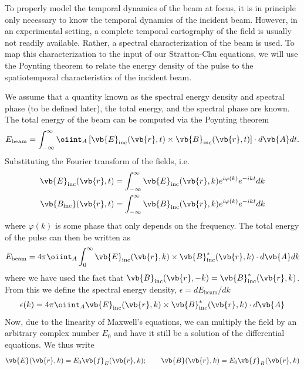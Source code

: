 \documentclass[11pt,SymmetricalJury]{inrsthesis/inrsthesis}
\begin{document}
To properly model the temporal dynamics of the beam at focus, it is in principle
only necessary to know the temporal dynamics of the incident beam. However, in
an experimental setting, a complete temporal cartography of the field is usually
not readily available. Rather, a spectral characterization of the beam is used.
To map this characterization to the input of our Stratton-Chu equations, we will
use the Poynting theorem to relate the energy density of the pulse to the
spatiotemporal characteristics of the incident beam.

We assume that a quantity known as the spectral energy density and spectral
phase (to be defined later), the total energy, and the spectral phase are
known. The total energy of the beam can be computed via the Poynting theorem
  \begin{equation}
    E_\text{beam}
      =
      \int_{-\infty}^\infty \oiint_A
        \left[\vb{E}_\text{inc}(\vb{r},t)\times\vb{B}_\text{inc}(\vb{r},t)\right]\cdot d\vb{A}dt.
  \end{equation}
Substituting the Fourier transform of the fields, i.e.
  \begin{align}
    \vb{E}_\text{inc}(\vb{r},t) &=
      \int_{-\infty}^\infty
        \vb{E}_\text{inc}(\vb{r},k)e^{i\varphi(k)}e^{-ik t} dk \\
    \vb{B_\text{inc}}(\vb{r},t) &=
      \int_{-\infty}^\infty
        \vb{B}_\text{inc}(\vb{r},k)e^{i\varphi(k)}e^{-ik t} dk
  \end{align}
where $\varphi(k)$ is some phase that only depends on the frequency. The total
energy of the pulse can then be written as
  \begin{equation}
    E_\text{beam} = 4\pi \oiint_A \int_0^\infty
        \real{\vb{E}_\text{inc}(\vb{r},k)\times\vb{B}_\text{inc}^*(\vb{r},k)}\cdot d\vb{A}dk
  \end{equation}
where we have used the fact that
$\vb{B}_\text{inc}(\vb{r},-k)=\vb{B}_\text{inc}^*(\vb{r},k)$. From this we
define the spectral energy density,  $\epsilon=dE_\text{beam}/dk$
  \begin{equation}
    \epsilon(k)
      = 4\pi\oiint_A \real{\vb{E}_\text{inc}(\vb{r},k)\times\vb{B}_\text{inc}^*(\vb{r},k)}\cdot d\vb{A}
  \end{equation}
Now, due to the linearity of Maxwell's equations, we can multiply the field by
an arbitrary complex number $E_0$ and have it still be a solution of the
differential equations. We thus write
  \begin{equation}
    \vb{E}(\vb{r},k) = E_0\vb{f}_E(\vb{r},k); \qquad
    \vb{B}(\vb{r},k) = E_0\vb{f}_B(\vb{r},k)
  \end{equation}
\end{document}
